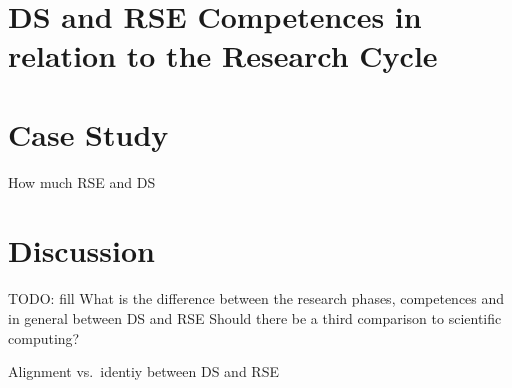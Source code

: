\documentclass[
        english,biblatex
    ]{lni}
\begin{document}
    \section{DS and RSE Competences in relation to the Research
    Cycle}\label{ds-and-rse-competences-in-relation-to-the-research-cycle}

    \section{Case Study}\label{case-study}

    How much RSE and DS

    \section{Discussion}\label{discussion}

    TODO: fill What is the difference between the research phases,
    competences and in general between DS and RSE Should there be a
    third comparison to scientific computing?

    Alignment vs.~identiy between DS and RSE


    \printbibliography
\end{document}

